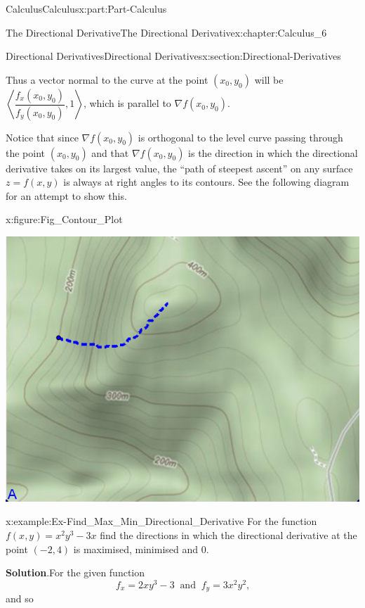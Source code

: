 \documentclass[oneside,10pt,]{book}
\newcommand{\blocktitlefont}{\relax}
\numberwithin{equation}{section}
\begin{document}
\begin{partptx}{Calculus}{}{Calculus}{}{}{x:part:Part-Calculus}
\begin{chapterptx}{The Directional Derivative}{}{The Directional Derivative}{}{}{x:chapter:Calculus_6}
\begin{sectionptx}{Directional Derivatives}{}{Directional Derivatives}{}{}{x:section:Directional-Derivatives}
\begin{enumerate}[label=\arabic*]
Thus a vector normal to the curve at the point \((x_0,y_0)\) will be \(\left \langle \dfrac{f_x(x_0,y_0)}{f_y(x_0,y_0)}, 1 \right \rangle\), which is parallel to \(\nabla f(x_0,y_0)\).%
\par
Notice that since \(\nabla f(x_0,y_0)\) is orthogonal to the level curve passing through the point \((x_0,y_0)\) and that \(\nabla f (x_0,y_0)\) is the direction in which the directional derivative takes on its largest value, the ``path of steepest ascent'' on any surface \(z=f(x,y)\) is always at right angles to its contours. See the following diagram for an attempt to show this.%
\begin{figureptx}{}{x:figure:Fig_Contour_Plot}{}%
\begin{image}{0.15}{0.7}{0.15}%
\includegraphics[width=\linewidth]{./Calculus/Images/6/Fig4_Contour_Plot.png}
\end{image}%
\tcblower
\end{figureptx}%
\end{enumerate}
%
\begin{example}{}{x:example:Ex-Find_Max_Min_Directional_Derivative}%
For the function \(f(x,y) = x^2y^3-3x\) find the directions in which the directional derivative at the point \((-2,4)\) is maximised, minimised and \(0\).%
\par\smallskip%
\noindent\textbf{\blocktitlefont Solution}.\hypertarget{g:solution:id550201}{}\quad{}For the given function%
\begin{equation*}
f_x = 2xy^3-3 \: \text{ and } \: f_y = 3x^2y^2\text{,}
\end{equation*}
and so%
\begin{equation*}

\end{equation*}
\end{example}
\end{sectionptx}
\end{chapterptx}
\end{partptx}
\end{document}
